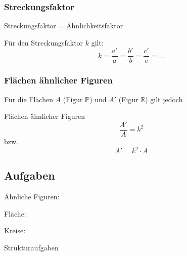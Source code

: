 \subsubsection{Streckungsfaktor}
\begin{gesetz}{Streckungsfaktor
    = Ähnlichkeitsfaktor}{}

  Für den Streckungsfaktor $k$ gilt:
  $$k = \frac{a'}{a} = \frac{b'}{b} = \frac{c'}{c} = ...$$
\end{gesetz}

\newpage

\subsubsection{Flächen ähnlicher Figuren}
Für die Flächen $A$ (Figur $\mathbb{P}$) und $A'$ (Figur $\mathbb{R}$) gilt jedoch

\begin{gesetz}{Flächen ähnlicher Figuren}{}
  $$\frac{A'}{A} = k^2$$
  bzw.
  $$A' = k^2 \cdot{} A$$
\end{gesetz}


\subsection*{Aufgaben}

Ähnliche Figuren:

Fläche:

Kreise:


Strukturaufgaben



